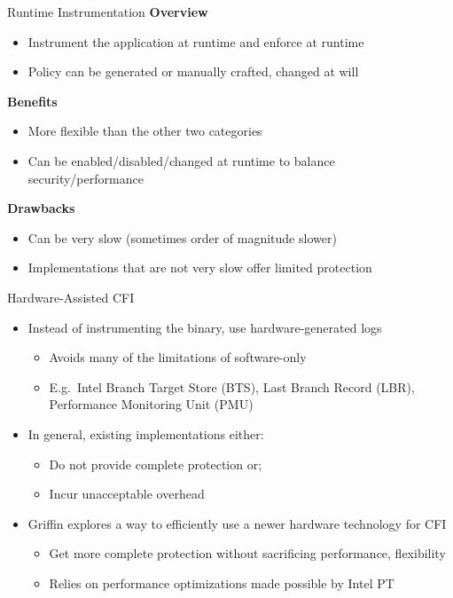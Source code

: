 \documentclass[12pt, dvipsnames, aspectratio=169]{beamer}
\newcommand{\red}[1]{{\color{red}#1}}
\newcommand{\blue}[1]{{\color{blue}#1}}
\begin{document}
\begin{frame}[c]{Runtime Instrumentation}{}
  {\bf Overview}
  \begin{itemize}
    \item Instrument the application at runtime and enforce at runtime
    \item Policy can be generated or manually crafted, changed at will
  \end{itemize}

  \vfill
  {\bf \blue{Benefits}}
  \begin{itemize}
    \item More flexible than the other two categories
    \item Can be enabled/disabled/changed at runtime to balance security/performance
  \end{itemize}

  \vfill
  {\bf \red{Drawbacks}}
  \begin{itemize}
    \item Can be very slow (sometimes order of magnitude slower)
    \item Implementations that are not very slow offer limited protection
  \end{itemize}
\end{frame}

\begin{frame}[c]{Hardware-Assisted CFI}{}
  \begin{itemize}
    \item Instead of instrumenting the binary, use hardware-generated logs
    \begin{itemize}
      \item Avoids many of the limitations of software-only
      \item E.g.~Intel Branch Target Store (BTS), Last Branch Record (LBR), Performance Monitoring Unit (PMU)
    \end{itemize}

    \vfill
    \item In general, existing implementations either:
    \begin{itemize}
      \item Do not provide complete protection or;
      \item Incur unacceptable overhead
    \end{itemize}

    \vfill
    \item Griffin explores a way to efficiently use a newer hardware technology for CFI
    \begin{itemize}
      \item Get more complete protection without sacrificing performance, flexibility
      \item Relies on performance optimizations made possible by Intel PT
    \end{itemize}
  \end{itemize}
\end{frame}
\end{document}
